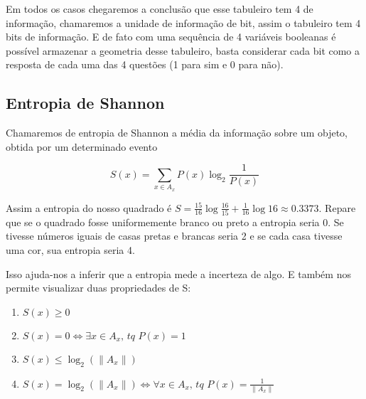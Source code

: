 \documentclass{article}
\begin{document}
Em todos os casos chegaremos a conclusão que esse tabuleiro tem 4 de informação, chamaremos a unidade de informação de bit, assim o tabuleiro tem 4 bits de informação. E de fato com uma sequência de 4 variáveis booleanas é possível armazenar a geometria desse tabuleiro, basta considerar cada bit como a resposta de cada uma das 4 questões (1 para sim e 0 para não).

\subsection{Entropia de Shannon}

Chamaremos  de entropia de Shannon a média da informação sobre um objeto, obtida por um determinado evento

\begin{equation}
    S(x) = \sum_{x \in A_x} P(x)\log_2 \frac{1}{P(x)}
\end{equation}

Assim a entropia do nosso quadrado é $S = \frac{15}{16} \log \frac{16}{15} + \frac{1}{16} \log 16 \approx 0.3373$. Repare que se o quadrado fosse uniformemente branco ou preto a entropia seria 0. Se tivesse números iguais de casas pretas e brancas seria 2 e se cada casa tivesse uma cor, sua entropia seria 4.

Isso ajuda-nos a inferir que a entropia mede a incerteza de algo. E também nos permite visualizar duas propriedades de S:

\begin{enumerate}
    \item $S(x) \geq 0$
    \item $S(x) = 0 \iff \exists x \in A_x, \, tq \,\, P(x)=1$
    \item $S(x) \leq \log_2(\| A_x \|)$
    \item $S(x) = \log_2 (\| A_x \|) \iff \forall x \in A_x,\,tq \,\, P(x)= \frac{1}{\| A_x \|}$
\end{enumerate}
\end{document}
